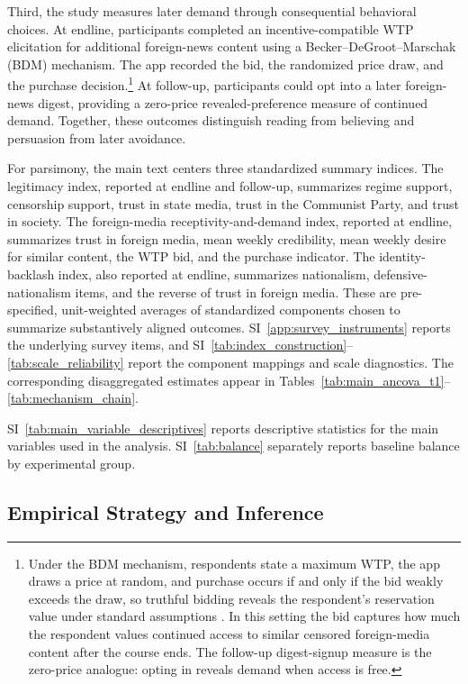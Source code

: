 \documentclass[12pt,american]{article}
\begin{document}
		Third, the study measures later demand through consequential behavioral choices. At endline, participants completed an incentive-compatible WTP elicitation for additional foreign-news content using a Becker--DeGroot--Marschak (BDM) mechanism. The app recorded the bid, the randomized price draw, and the purchase decision.\footnote{Under the BDM mechanism, respondents state a maximum WTP, the app draws a price at random, and purchase occurs if and only if the bid weakly exceeds the draw, so truthful bidding reveals the respondent's reservation value under standard assumptions \citep{BeckerDeGrootMarschak1964}. In this setting the bid captures how much the respondent values continued access to similar censored foreign-media content after the course ends. The follow-up digest-signup measure is the zero-price analogue: opting in reveals demand when access is free.} At follow-up, participants could opt into a later foreign-news digest, providing a zero-price revealed-preference measure of continued demand. Together, these outcomes distinguish reading from believing and persuasion from later avoidance.
	
		For parsimony, the main text centers three standardized summary indices. The legitimacy index, reported at endline and follow-up, summarizes regime support, censorship support, trust in state media, trust in the Communist Party, and trust in society. The foreign-media receptivity-and-demand index, reported at endline, summarizes trust in foreign media, mean weekly credibility, mean weekly desire for similar content, the WTP bid, and the purchase indicator. The identity-backlash index, also reported at endline, summarizes nationalism, defensive-nationalism items, and the reverse of trust in foreign media. These are pre-specified, unit-weighted averages of standardized components chosen to summarize substantively aligned outcomes. SI~\ref{app:survey_instruments} reports the underlying survey items, and SI~\ref{tab:index_construction}--\ref{tab:scale_reliability} report the component mappings and scale diagnostics. The corresponding disaggregated estimates appear in Tables~\ref{tab:main_ancova_t1}--\ref{tab:mechanism_chain}.

		SI~\ref{tab:main_variable_descriptives} reports descriptive statistics for the main variables used in the analysis. SI~\ref{tab:balance} separately reports baseline balance by experimental group.
	
	\subsection*{Empirical Strategy and Inference}
	
\end{document}

